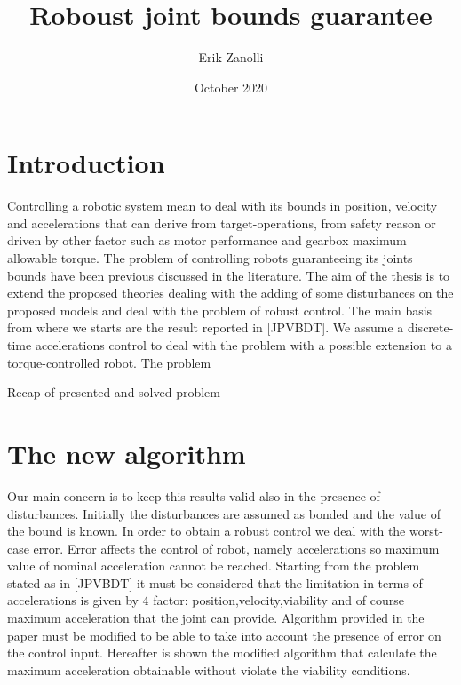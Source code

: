 \documentclass{article}
\title{Roboust joint bounds guarantee}
\author{Erik Zanolli}
\date{October 2020}
\begin{document}
\maketitle


\section{Introduction}
Controlling a robotic system mean to deal with its bounds in position, velocity and accelerations that can derive from target-operations, from safety reason or driven by other factor such as motor performance and gearbox maximum allowable torque. The problem of controlling robots guaranteeing its joints bounds have been previous discussed in the literature. The aim of the thesis is to extend the proposed theories dealing with the adding of some disturbances on the proposed models and deal with the problem of robust control. The main basis from where we starts are the result reported in [JPVBDT]. We assume a discrete-time accelerations control to deal with the problem with a possible extension to a torque-controlled robot. The problem  

Recap of presented and solved problem

\section{The new algorithm}
Our main concern is to keep this results valid also in the presence of disturbances. Initially the disturbances are assumed as bonded and the value of the bound is known. In order to obtain a robust control we deal with the worst-case error. Error affects the control of robot, namely accelerations so maximum value of nominal acceleration cannot be reached. Starting from the problem stated as in [JPVBDT] it must be considered that the limitation in terms of accelerations is given by 4 factor: position,velocity,viability and of course maximum acceleration that the joint can provide. Algorithm provided in the paper must be modified to be able to take into account the presence of error on the control input. Hereafter is shown the modified algorithm that calculate the maximum acceleration obtainable without violate the viability conditions.
\end{document}
